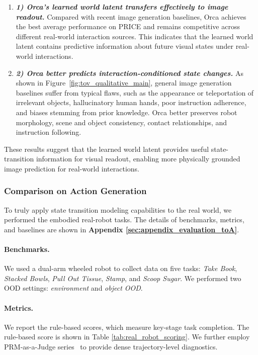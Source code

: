 \begin{enumerate}[
    leftmargin=1.35em,
    itemsep=0.35em,
    topsep=0.35em,
    parsep=0em
]
    \item[] \textit{\textbf{1) Orca's learned world latent transfers effectively to image readout.}} 
    Compared with recent image generation baselines, Orca achieves the best average performance on PRICE and remains competitive across different real-world interaction sources. 
    This indicates that the learned world latent contains predictive information about future visual states under real-world interactions.

    \item[] \textit{\textbf{2) Orca better predicts interaction-conditioned state changes.}} 
    As shown in Figure~\ref{fig:tov_qualitative_main}, general image generation baselines suffer from typical flaws, such as the appearance or teleportation of irrelevant objects, hallucinatory human hands, poor instruction adherence, and biases stemming from prior knowledge. Orca better preserves robot morphology, scene and object consistency, contact relationships, and instruction following.
\end{enumerate}

These results suggest that the learned world latent provides useful state-transition information for visual readout, enabling more physically grounded image prediction for real-world interactions.


\subsubsection{Comparison on Action Generation}\label{sec:evaluation_toA}
To truly apply state transition modeling capabilities to the real world, we performed the embodied real-robot tasks. The details of benchmarks, metrics, and baselines are shown in \textbf{Appendix \ref{sec:appendix_evaluation_toA}}.

\paragraph{Benchmarks.} 

We used a dual-arm wheeled robot to collect data on five tasks: \textit{Take Book}, \textit{Stacked Bowls}, \textit{Pull Out Tissue}, \textit{Stamp}, and \textit{Scoop Sugar}. We performed two OOD settings: \textit{environment} and \textit{object OOD}. 

\paragraph{Metrics.} 
We report the rule-based scores, which measure key-stage task completion. The rule-based score is shown in Table \ref{tab:real_robot_scoring}.
We further employ PRM-as-a-Judge series~\citep{PRM-as-a-Judge, judge1.5} to provide dense trajectory-level diagnostics.


